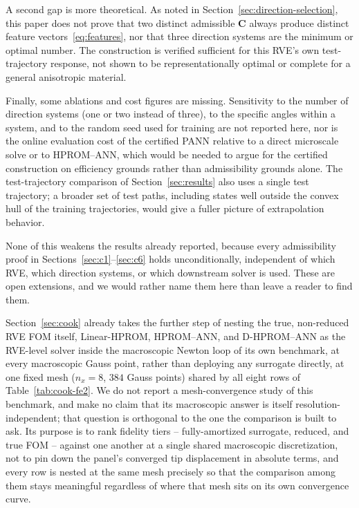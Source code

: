 \documentclass[10pt,a4paper]{article}
\begin{document}
A second gap is more theoretical. As noted in
Section~\ref{sec:direction-selection}, this paper does not prove that
two distinct admissible $\bm C$ always produce distinct feature
vectors~\eqref{eq:features}, nor that three direction systems are the
minimum or optimal number. The construction is verified sufficient for
this RVE's own test-trajectory response, not shown to be representationally
optimal or complete for a general anisotropic material.

Finally, some ablations and cost figures are missing. Sensitivity to
the number of direction systems (one or two instead of three), to the
specific angles within a system, and to the random seed used for
training are not reported here, nor is the online evaluation cost of
the certified PANN relative to a direct microscale solve or to
HPROM--ANN, which would be needed to argue for the certified
construction on efficiency grounds rather than admissibility grounds
alone. The test-trajectory comparison of Section~\ref{sec:results} also uses a
single test trajectory; a broader set of test paths, including
states well outside the convex hull of the training trajectories, would
give a fuller picture of extrapolation behavior.

None of this weakens the results already reported, because every admissibility
proof in Sections~\ref{sec:c1}--\ref{sec:c6} holds unconditionally,
independent of which RVE, which direction systems, or which downstream
solver is used. These are open extensions, and we would rather name
them here than leave a reader to find them.

Section~\ref{sec:cook} already takes the further step of nesting
the true, non-reduced RVE FOM itself, Linear-HPROM, HPROM--ANN, and
D-HPROM--ANN as the RVE-level solver inside the macroscopic Newton loop of
its own benchmark, at every macroscopic Gauss point, rather than
deploying any surrogate directly, at one fixed mesh ($n_x=8$, $384$
Gauss points) shared by all eight rows of Table~\ref{tab:cook-fe2}. We do not report a
mesh-convergence study of this benchmark, and make no claim that its
macroscopic answer is itself resolution-independent; that question is
orthogonal to the one the comparison is built to ask. Its purpose is to
rank fidelity tiers -- fully-amortized surrogate, reduced, and true FOM --
against one another at a single shared macroscopic discretization, not to
pin down the panel's converged tip displacement in absolute terms, and
every row is nested at the same mesh precisely so that the comparison
among them stays meaningful regardless of where that mesh sits on its own
convergence curve.
\end{document}
